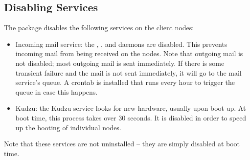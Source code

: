%
%
%

\subsection{Disabling Services}

The  package disables the following services on
the client nodes:

\begin{itemize}
\item Incoming mail service: the , , and
   daemons are disabled.  This prevents incoming mail
  from being received on the nodes.  Note that outgoing mail is not
  disabled; most outgoing mail is sent immediately.  If there is some
  transient failure and the mail is not sent immediately, it will go
  to the mail service's queue.  A  crontab is installed
  that runs every hour to trigger the queue in case this happens.

\item Kudzu: the Kudzu service looks for new hardware, usually upon
  boot up.  At boot time, this process takes over 30 seconds.  It is
  disabled in order to speed up the booting of individual nodes.

\end{itemize}

Note that these services are not uninstalled -- they are simply
disabled at boot time.
